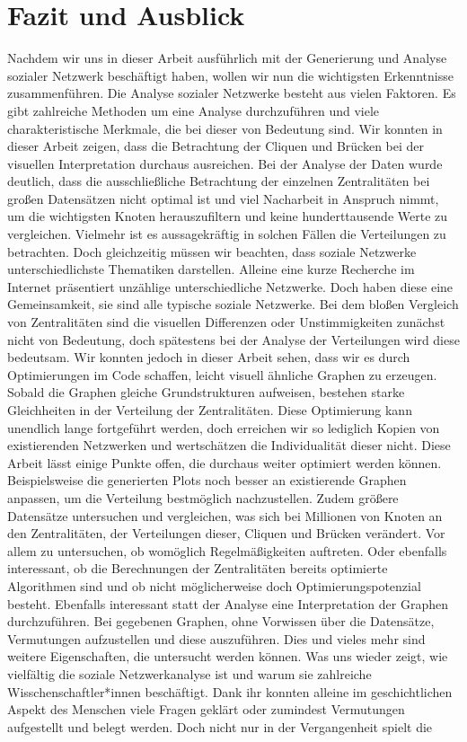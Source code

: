 \chapter{Fazit und Ausblick}\label{ch:fazit}

Nachdem wir uns in dieser Arbeit ausführlich mit der  Generierung und Analyse sozialer Netzwerk beschäftigt haben, wollen wir nun die wichtigsten Erkenntnisse zusammenführen. Die Analyse sozialer Netzwerke besteht aus vielen Faktoren. Es gibt zahlreiche Methoden um eine Analyse durchzuführen und viele charakteristische Merkmale, die bei dieser von Bedeutung sind. Wir konnten in dieser Arbeit zeigen, dass die Betrachtung der Cliquen und Brücken bei der visuellen Interpretation durchaus ausreichen. Bei der Analyse der Daten wurde deutlich, dass die ausschließliche Betrachtung der einzelnen Zentralitäten bei großen Datensätzen nicht optimal ist und viel Nacharbeit in Anspruch nimmt, um die wichtigsten Knoten herauszufiltern und keine hunderttausende Werte zu vergleichen. Vielmehr ist es aussagekräftig in solchen Fällen die Verteilungen zu betrachten. Doch gleichzeitig müssen wir beachten, dass soziale Netzwerke unterschiedlichste Thematiken darstellen. Alleine eine kurze Recherche im Internet präsentiert unzählige unterschiedliche Netzwerke. Doch haben diese eine Gemeinsamkeit, sie sind alle typische soziale Netzwerke. Bei dem bloßen Vergleich von Zentralitäten sind die visuellen Differenzen oder Unstimmigkeiten zunächst nicht von Bedeutung, doch spätestens bei der Analyse der Verteilungen wird diese bedeutsam. Wir konnten jedoch in dieser Arbeit sehen, dass wir es durch Optimierungen im Code schaffen, leicht visuell ähnliche Graphen zu erzeugen. Sobald die Graphen gleiche Grundstrukturen aufweisen, bestehen starke Gleichheiten in der Verteilung der Zentralitäten. Diese Optimierung kann unendlich lange fortgeführt werden, doch erreichen wir so lediglich Kopien von existierenden Netzwerken und wertschätzen die Individualität dieser nicht. Diese Arbeit lässt einige Punkte offen, die durchaus weiter optimiert werden können. Beispielsweise die generierten Plots noch besser an existierende Graphen anpassen, um die Verteilung bestmöglich nachzustellen. Zudem größere Datensätze untersuchen und vergleichen, was sich bei Millionen von Knoten an den Zentralitäten, der Verteilungen dieser, Cliquen und Brücken verändert. Vor allem zu untersuchen, ob womöglich Regelmäßigkeiten auftreten. Oder ebenfalls interessant, ob die Berechnungen der Zentralitäten bereits optimierte Algorithmen sind und ob nicht möglicherweise doch Optimierungspotenzial besteht. Ebenfalls interessant statt der Analyse eine Interpretation der Graphen durchzuführen. Bei gegebenen Graphen, ohne Vorwissen über die Datensätze, Vermutungen aufzustellen und diese auszuführen. Dies und vieles mehr sind weitere Eigenschaften, die untersucht werden können. Was uns wieder zeigt, wie vielfältig die soziale Netzwerkanalyse ist und warum sie zahlreiche Wisschenschaftler*innen beschäftigt. Dank ihr konnten alleine im geschichtlichen Aspekt des Menschen viele Fragen geklärt oder zumindest Vermutungen aufgestellt und belegt werden. Doch nicht nur in der Vergangenheit spielt die 